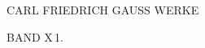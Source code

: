 \NoSourceHead
\vspace*{.28\textheight}
\begin{center}
{\Large CARL FRIEDRICH GAUSS WERKE\par}
\vspace{1.3cm}
{\large BAND X\,\normalsize 1.\par}
\end{center}
\clearpage
